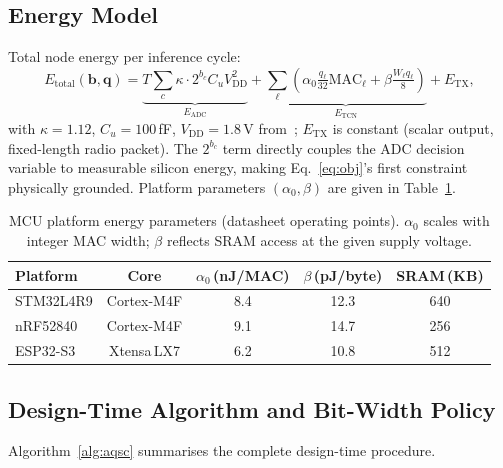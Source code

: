 \documentclass[12pt,a4paper]{article}
\newcommand{\vect}[1]{\boldsymbol{#1}}
\begin{document}
\subsection{Energy Model}
\label{sec:energy}

Total node energy per inference cycle:
\begin{equation}
  E_\mathrm{total}(\vect{b},\vect{q})
    = \underbrace{T\sum_c\kappa\cdot2^{b_c}C_u V_\mathrm{DD}^2}_{E_\mathrm{ADC}}
    + \underbrace{\sum_\ell\!\left(\alpha_0\tfrac{q_\ell}{32}\mathrm{MAC}_\ell
      + \beta\tfrac{W_\ell q_\ell}{8}\right)}_{E_\mathrm{TCN}}
    + E_\mathrm{TX},
  \label{eq:etotal}
\end{equation}
with $\kappa=1.12$, $C_u=100$\,fF, $V_\mathrm{DD}=1.8$\,V
from~\cite{murmann2023adc}; $E_\mathrm{TX}$ is constant (scalar
output, fixed-length radio packet).
The $2^{b_c}$ term directly couples the ADC decision variable to
measurable silicon energy, making Eq.~\eqref{eq:obj}'s first
constraint physically grounded.
Platform parameters $(\alpha_0, \beta)$ are given in
Table~\ref{tab:platforms}.

\begin{table}[ht]
\centering
\caption{MCU platform energy parameters (datasheet operating points).
$\alpha_0$ scales with integer MAC width; $\beta$ reflects SRAM
access at the given supply voltage.}
\label{tab:platforms}
\setlength{\tabcolsep}{5pt}
\begin{tabular}{@{}lcccc@{}}
\toprule
\textbf{Platform} & \textbf{Core} &
  $\alpha_0$\,(nJ/MAC) & $\beta$\,(pJ/byte) & SRAM\,(KB) \\
\midrule
STM32L4R9 & Cortex-M4F  & 8.4 & 12.3 & 640 \\
nRF52840  & Cortex-M4F  & 9.1 & 14.7 & 256 \\
ESP32-S3  & Xtensa\,LX7 & 6.2 & 10.8 & 512 \\
\bottomrule
\end{tabular}
\end{table}

\subsection{Design-Time Algorithm and Bit-Width Policy}
\label{sec:algo}

Algorithm~\ref{alg:aqsc} summarises the complete design-time
procedure.
\end{document}
